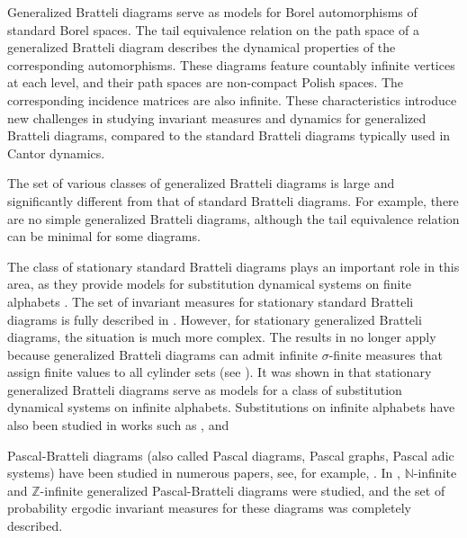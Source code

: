\documentclass[11pt, twoside]{amsart}
\theoremstyle{definition}
\theoremstyle{remark}
\theoremstyle{plain}
\numberwithin{equation}{section}
\begin{document}
Generalized Bratteli diagrams serve as models for Borel automorphisms of standard Borel spaces. The tail equivalence relation on the path space of a generalized Bratteli diagram describes the dynamical properties of the corresponding automorphisms. These diagrams feature countably infinite vertices at each level, and their path spaces are non-compact Polish spaces. The corresponding incidence matrices are also infinite. These characteristics introduce new challenges in studying invariant measures and dynamics for generalized Bratteli diagrams, compared to the standard Bratteli diagrams typically used in Cantor dynamics. 

The set of various classes of generalized Bratteli diagrams is large and significantly different from that of standard Bratteli diagrams. For example, there are no simple generalized Bratteli diagrams, although the tail equivalence relation can be minimal for some diagrams.

The class of stationary standard Bratteli diagrams plays an important role in this area, as they provide models for substitution dynamical systems on finite alphabets \cite{Forrest1997, Durand_Host_skau_1999, BezuglyiKwiatkowskiMedynets2009}. The set of invariant measures for stationary standard Bratteli diagrams is fully described in \cite{BezuglyiKwiatkowskiMedynetsSolomyak2010}. However, for stationary generalized Bratteli diagrams, the situation is much more complex. The results in \cite{BezuglyiKwiatkowskiMedynetsSolomyak2010} no longer apply because generalized Bratteli diagrams can admit infinite $\sigma$-finite measures that assign finite values to all cylinder sets (see \cite{BezuglyiKarpelKwiatkowski2024}). It was shown in \cite{BezuglyiJorgensenSanadhya2024} that stationary generalized Bratteli diagrams serve as models for a class of substitution dynamical systems on infinite alphabets. Substitutions on infinite alphabets have also been studied in works such as \cite{Ferenczi2006, Manibo_Rust_Walton_2022}, and \cite{Frettloh_Garber_Manibo_2022}

Pascal-Bratteli diagrams (also called Pascal diagrams, Pascal graphs, Pascal adic systems) have been studied in numerous papers, see, for example, \cite{Boca2008, FrickOrmes2013, FrickPetersen2010, Fricketal2017, MelaPetersen2005, Mela2006, Mundici2011, Strasser2011, Vershik2014}. In \cite{BezuglyiKarpelKwiatkowskiWata2024}, $\mathbb{N}$-infinite and $\mathbb{Z}$-infinite generalized Pascal-Bratteli diagrams were studied, and the set of probability ergodic invariant measures for these diagrams was completely described.
\end{document}
